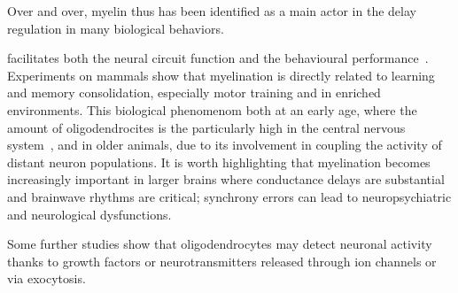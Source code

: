 \documentclass[brainsci, %
               review,submit,pdftex,moreauthors
               ]{Definitions/mdpi}
\begin{document}
Over and over, myelin thus has been identified as a main actor in the delay regulation in many biological behaviors.


facilitates both the neural circuit function and the behavioural performance~\cite{fields_2015}. Experiments on mammals show that myelination is directly related to learning and memory consolidation, especially motor training and in enriched environments. This biological phenomenom both at an early age, where the amount of oligodendrocites is the particularly high in the central nervous system~\citep{reynolds_1928}, and in older animals, due to its involvement in coupling the activity of distant neuron populations. It is worth highlighting that myelination becomes increasingly important in larger brains where conductance delays are substantial and brainwave rhythms are critical; synchrony errors can lead to neuropsychiatric and neurological dysfunctions. 


Some further studies show that oligodendrocytes may detect neuronal activity thanks to growth factors or neurotransmitters released through ion channels or via exocytosis.



\end{document}

